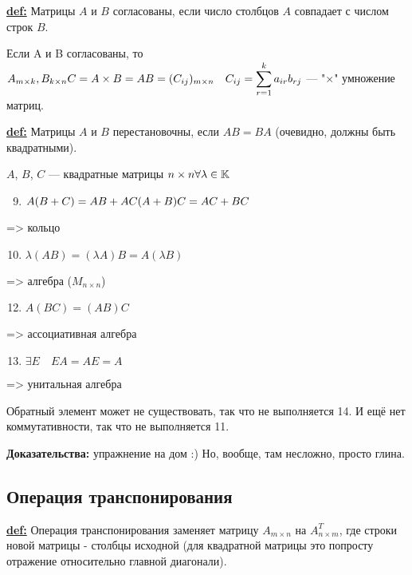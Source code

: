 \textbf{\underline{def:}} Матрицы $A$ и $B$ согласованы, если число столбцов $A$ совпадает с числом строк $B$.

Если A и B согласованы, то
\( A_{m \times k}, B_{k \times n} \newline
C = A \times B = A B = (C_{ij})_{m \times n} \quad C_{ij} = \displaystyle{\sum^{k}_{r=1}a_{ir}b_{rj}} \)
--- "$\times$" умножение матриц.

\textbf{\underline{def:}} Матрицы $A$ и $B$ перестановочны, если $ AB = BA $ (очевидно, должны быть квадратными).

$A$, $B$, $C$ --- квадратные матрицы $ n \times n \newline
    \forall \lambda \in \mathbb{K}$
\begin{enumerate}
    \setcounter{enumi}{8}
    \item $ A(B+C) = AB + AC \newline
              (A+B)C = AC + BC $
\end{enumerate} => кольцо

\begin{enumerate}
    \setcounter{enumi}{9}
    \item $ \lambda (AB) = (\lambda A)B = A(\lambda B)$
\end{enumerate} => алгебра ($ M_{n \times n} $)

\begin{enumerate}
    \setcounter{enumi}{11}
    \item $ A(BC) = (AB)C$
\end{enumerate} => ассоциативная алгебра

\begin{enumerate}
    \setcounter{enumi}{12}
    \item $ \exists E \quad EA=AE=A$
\end{enumerate} => унитальная алгебра

Обратный элемент может не существовать, так что не выполняется 14. И ещё нет коммутативности, так что не выполняется 11.

\textbf{Доказательства:} упражнение на дом :) Но, вообще, там несложно, просто глина.


\subsection{Операция транспонирования}

\textbf{\underline{def:}} Операция транспонирования заменяет матрицу $ A_{m \times n} $ на $ A^T_{n \times m} $, где строки новой матрицы - столбцы исходной (для квадратной матрицы это попросту отражение относительно главной диагонали).

